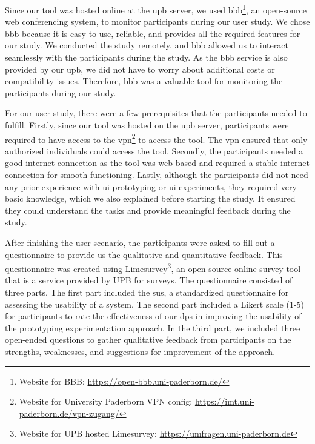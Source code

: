 Since our tool was hosted online at the \ac{upb} server, we used \ac{bbb}\footnote{Website for BBB: \url{https://open-bbb.uni-paderborn.de/}}, an open-source web conferencing system, to monitor participants during our user study.
We chose \ac{bbb} because it is easy to use, reliable, and provides all the required features for our study. 
We conducted the study remotely, and \ac{bbb} allowed us to interact seamlessly with the participants during the study. 
As the \ac{bbb} service is also provided by our \ac{upb}, we did not have to worry about additional costs or compatibility issues. 
Therefore, \ac{bbb} was a valuable tool for monitoring the participants during our study.

For our user study, there were a few prerequisites that the participants needed to fulfill. 
Firstly, since our tool was hosted on the \ac{upb} server, participants were required to have access to the \ac{vpn}\footnote{Website for University Paderborn VPN config: \url{https://imt.uni-paderborn.de/vpn-zugang/}} to access the tool. 
The \ac{vpn} ensured that only authorized individuals could access the tool.
Secondly, the participants needed a good internet connection as the tool was web-based and required a stable internet connection for smooth functioning. 
Lastly, although the participants did not need any prior experience with \ac{ui} prototyping or \ac{ui} experiments, they required very basic knowledge, which we also explained before starting the study. 
It ensured they could understand the tasks and provide meaningful feedback during the study.

After finishing the user scenario, the participants were asked to fill out a questionnaire to provide us the qualitative and quantitative feedback.
This questionnaire was created using Limesurvey\footnote{Website for UPB hosted Limesurvey: \url{https://umfragen.uni-paderborn.de}}, an open-source online survey tool that is a service provided by UPB for surveys. 
The questionnaire consisted of three parts. 
The first part included the \ac{sus}, a standardized questionnaire for assessing the usability of a system. 
The second part included a Likert scale (1-5) for participants to rate the effectiveness of our \ac{dp}s in improving the usability of the prototyping experimentation approach. 
In the third part, we included three open-ended questions to gather qualitative feedback from participants on the strengths, weaknesses, and suggestions for improvement of the approach.



